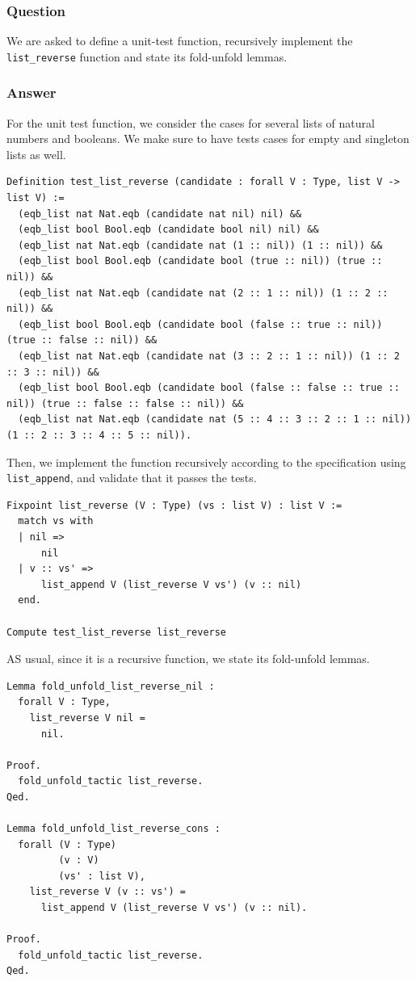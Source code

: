 \documentclass{article}
\begin{document}
\subsubsection{Question}
We are asked to define a unit-test function, recursively implement the \texttt{list\_reverse} function and state its fold-unfold lemmas.

\subsubsection{Answer}
For the unit test function, we consider the cases for several lists of natural numbers and booleans. We make sure to have tests cases for empty and singleton lists as well.

\begin{lstlisting}
Definition test_list_reverse (candidate : forall V : Type, list V -> list V) :=
  (eqb_list nat Nat.eqb (candidate nat nil) nil) &&
  (eqb_list bool Bool.eqb (candidate bool nil) nil) &&
  (eqb_list nat Nat.eqb (candidate nat (1 :: nil)) (1 :: nil)) &&
  (eqb_list bool Bool.eqb (candidate bool (true :: nil)) (true :: nil)) &&
  (eqb_list nat Nat.eqb (candidate nat (2 :: 1 :: nil)) (1 :: 2 :: nil)) &&
  (eqb_list bool Bool.eqb (candidate bool (false :: true :: nil)) (true :: false :: nil)) &&
  (eqb_list nat Nat.eqb (candidate nat (3 :: 2 :: 1 :: nil)) (1 :: 2 :: 3 :: nil)) &&
  (eqb_list bool Bool.eqb (candidate bool (false :: false :: true :: nil)) (true :: false :: false :: nil)) &&
  (eqb_list nat Nat.eqb (candidate nat (5 :: 4 :: 3 :: 2 :: 1 :: nil)) (1 :: 2 :: 3 :: 4 :: 5 :: nil)).
\end{lstlisting}

Then, we implement the function recursively according to the specification using \texttt{list\_append}, and validate that it passes the tests.

\begin{lstlisting}
Fixpoint list_reverse (V : Type) (vs : list V) : list V :=
  match vs with
  | nil =>
      nil
  | v :: vs' =>
      list_append V (list_reverse V vs') (v :: nil)
  end.

Compute test_list_reverse list_reverse
\end{lstlisting}

AS usual, since it is a recursive function, we state its fold-unfold lemmas. 

\begin{lstlisting}
Lemma fold_unfold_list_reverse_nil :
  forall V : Type,
    list_reverse V nil =
      nil.

Proof.
  fold_unfold_tactic list_reverse.
Qed.

Lemma fold_unfold_list_reverse_cons :
  forall (V : Type)
         (v : V)
         (vs' : list V),
    list_reverse V (v :: vs') =
      list_append V (list_reverse V vs') (v :: nil).

Proof.
  fold_unfold_tactic list_reverse.
Qed.
\end{lstlisting}
\end{document}
